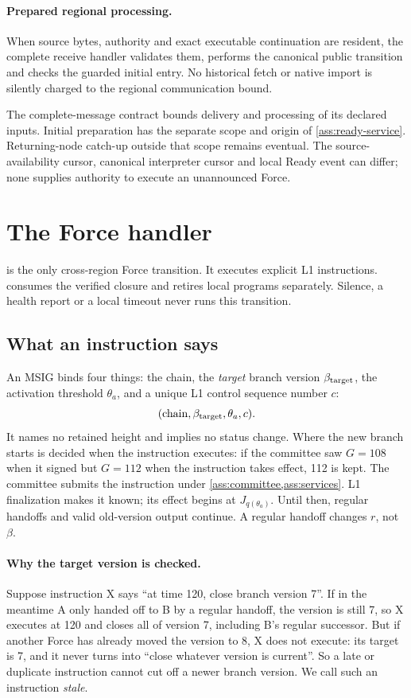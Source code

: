 \documentclass[11pt,a4paper]{article}
\newcommand{\defterm}[1]{\textcolor{rrBlue}{\textit{#1}}}
\begin{document}
\paragraph{Prepared regional processing.}
\label{sec:source-step-timing}
When source bytes, authority and exact executable continuation are
resident, the complete receive handler validates them, performs the
canonical public transition and checks the guarded initial entry.
No historical fetch or native import is silently charged to the
regional communication bound.

The complete-message contract bounds delivery and processing of its
declared inputs. Initial preparation has the separate scope and origin
of \cref{ass:ready-service}. Returning-node catch-up outside that scope
remains eventual. The source-availability cursor, canonical interpreter
cursor and local Ready event can differ; none supplies authority to
execute an unannounced Force.
\section{The Force handler}
\label{sec:force}
 is the only cross-region Force transition. It executes
explicit L1 instructions.  consumes the verified
closure and retires local programs separately. Silence, a health report
or a local timeout never runs this transition.

\subsection{What an instruction says}
\label{sec:force-stages}
An MSIG binds four things: the chain, the \emph{target} branch version
$\beta_{\rm target}$, the activation threshold $\theta_a$, and a unique L1
control sequence number $c$:
\[
 (\mathrm{chain},\beta_{\rm target},\theta_a,c).
\]
It names no retained height and implies no status change. Where the new
branch starts is decided when the instruction executes: if the committee
saw $G=108$ when it signed but $G=112$ when the instruction takes effect,
112 is kept. The committee submits the instruction under
\cref{ass:committee,ass:services}. L1 finalization makes it known; its
effect begins at $J_{q(\theta_a)}$. Until then, regular handoffs and
valid old-version output continue. A regular handoff changes $r$, not
$\beta$.

\paragraph{Why the target version is checked.}
Suppose instruction X says ``at time 120, close branch version 7''. If
in the meantime A only handed off to B by a regular handoff, the version
is still 7, so X executes at 120 and closes all of version 7, including
B's regular successor. But if another Force has already moved the
version to 8, X does not execute: its target is 7, and it never turns
into ``close whatever version is current''. So a late or duplicate
instruction cannot cut off a newer branch version. We call such an
instruction \defterm{stale}.
\end{document}

